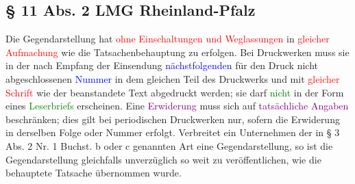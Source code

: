 \subsection{§ 11 Abs. 2 LMG Rheinland-Pfalz}
Die Gegendarstellung hat \textcolor{red}{ohne Einschaltungen und Weglassungen} in \textcolor{red}{gleicher Aufmachung} wie die Tatsachenbehauptung zu erfolgen. Bei Druckwerken muss sie in der nach Empfang der Einsendung \textcolor{blue}{nächstfolgenden} für den Druck nicht abgeschlossenen \textcolor{blue}{Nummer} in dem gleichen Teil des Druckwerks und mit \textcolor{red}{gleicher Schrift} wie der beanstandete Text abgedruckt werden; sie darf \textcolor{green}{nicht} in der Form eines \textcolor{green}{Leserbriefs} erscheinen. Eine \textcolor{purple}{Erwiderung} muss sich auf \textcolor{purple}{tatsächliche Angaben} beschränken; dies gilt bei periodischen Druckwerken nur, sofern die Erwiderung in derselben Folge oder Nummer erfolgt. Verbreitet ein Unternehmen der in § 3 Abs. 2 Nr. 1 Buchst. b oder c genannten Art eine Gegendarstellung, so ist die Gegendarstellung gleichfalls unverzüglich so weit zu veröffentlichen, wie die behauptete Tatsache übernommen wurde.

